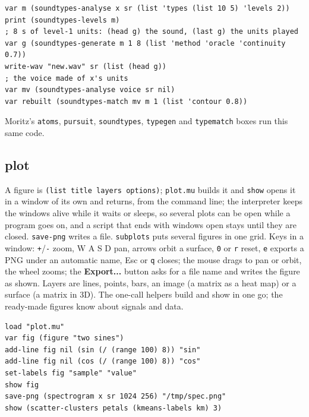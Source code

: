 \documentclass[11pt,a4paper]{article}
\newcommand{\musil}[1]{\lstinline[style=musilinline]{#1}}
\begin{document}
\begin{lstlisting}
var m (soundtypes-analyse x sr (list 'types (list 10 5) 'levels 2))
print (soundtypes-levels m)
; 8 s of level-1 units: (head g) the sound, (last g) the units played
var g (soundtypes-generate m 1 8 (list 'method 'oracle 'continuity 0.7))
write-wav "new.wav" sr (list (head g))
; the voice made of x's units
var mv (soundtypes-analyse voice sr nil)
var rebuilt (soundtypes-match mv m 1 (list 'contour 0.8))
\end{lstlisting}

Moritz's \texttt{atoms}, \texttt{pursuit}, \texttt{soundtypes}, \texttt{typegen} and
\texttt{typematch} boxes run this same code.



\subsection{plot}

A figure is \musil{(list title layers options)}; \musil{plot.mu} builds it and
\musil{show} opens it in a window of its own and returns, from the command line; the interpreter keeps the windows alive while it waits or sleeps, so
several plots can be open while a program goes on, and a script that ends with windows
open stays until they are closed. \musil{save-png} writes a file. \musil{subplots} puts
several figures in one grid. Keys in a window: \texttt{+}/\texttt{-} zoom, W A S D pan,
arrows orbit a surface, \texttt{0} or \texttt{r} reset, \texttt{e} exports a PNG under an
automatic name, Esc or \texttt{q} closes; the mouse drags to pan or orbit, the wheel zooms;
the \textbf{Export...} button asks for a file name and writes the figure as shown. Layers are lines, points, bars, an image (a matrix as
a heat map) or a surface (a matrix in 3D). The one-call helpers build and show in one
go; the ready-made figures know about signals and data.

\begin{lstlisting}
load "plot.mu"
var fig (figure "two sines")
add-line fig nil (sin (/ (range 100) 8)) "sin"
add-line fig nil (cos (/ (range 100) 8)) "cos"
set-labels fig "sample" "value"
show fig
save-png (spectrogram x sr 1024 256) "/tmp/spec.png"
show (scatter-clusters petals (kmeans-labels km) 3)
\end{lstlisting}


\end{document}
